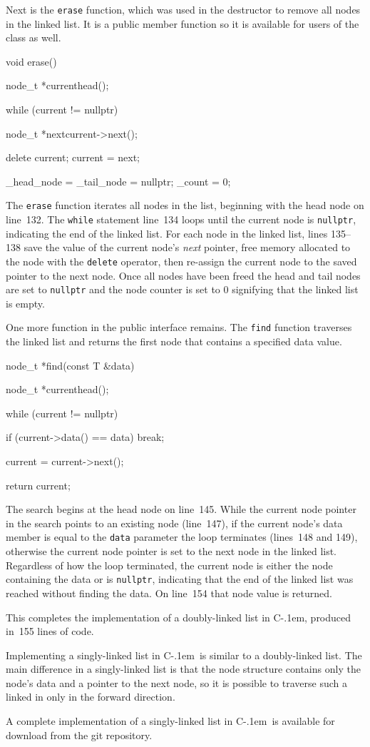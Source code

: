 \documentclass{article}
\newcommand{\Cpp}{\mbox{C\kern-.1em\raisebox{.35ex}{\smaller{\smaller{+\kern-0.05em+}}}}}
\begin{document}
  Next is the \verb|erase| function, which was used in the destructor to remove all nodes in the linked list. It is a public member function so it is available for users of the class as well.
  \begin{lstcpp}
  void erase() {
    node_t *current{head()};

    while (current != nullptr) {
      node_t *next{current->next()};

      delete current;
      current = next;
    }

    _head_node = _tail_node = nullptr;
    _count = 0;
  }\end{lstcpp}
  The \verb|erase| function iterates all nodes in the list, beginning with the head node on line~132. The \verb|while| statement line~134 loops until the current node is \verb|nullptr|, indicating the end of the linked list. For each node in the linked list, lines 135--138 save the value of the current node's \emph{next} pointer, free memory allocated to the node with the \verb|delete| operator, then re-assign the current node to the saved pointer to the next node. Once all nodes have been freed the head and tail nodes are set to \verb|nullptr| and the node counter is set to 0 signifying that the linked list is empty.

  One more function in the public interface remains. The \verb|find| function traverses the linked list and returns the first node that contains a specified data value.
  \begin{lstcpp}
  node_t *find(const T &data) {
    node_t *current{head()};

    while (current != nullptr) {
      if (current->data() == data)
        break;

      current = current->next();
    }

    return current;
  }\end{lstcpp}
  The search begins at the head node on line~145. While the current node pointer in the search points to an existing node (line~147), if the current node's data member is equal to the \verb|data| parameter the loop terminates (lines~148 and 149), otherwise the current node pointer is set to the next node in the linked list. Regardless of how the loop terminated, the current node is either the node containing the data or is \verb|nullptr|, indicating that the end of the linked list was reached without finding the data. On line~154 that node value is returned.


  This completes the implementation of a doubly-linked list in \Cpp, produced in~155 lines of code.

  Implementing a singly-linked list in \Cpp\ is similar to a doubly-linked list. The main difference in a singly-linked list is that the node structure contains only the node's data and a pointer to the next node, so it is possible to traverse such a linked in only in the forward direction.

  A complete implementation of a singly-linked list in \Cpp\ is available for download from the git repository.
\end{document}
